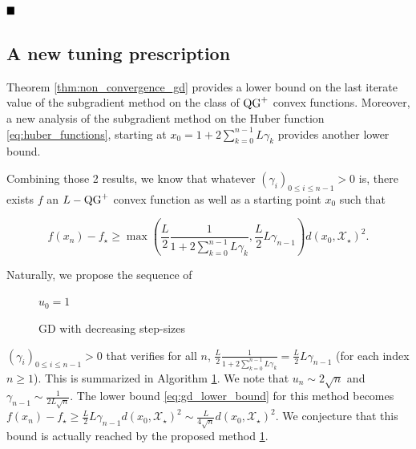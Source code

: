 $\hfill\blacksquare$

\subsection{A new tuning prescription}\label{apx:gd_conjecture}

Theorem \ref{thm:non_convergence_gd} provides a lower bound on the last iterate value of the subgradient method on the class of $\operatorname{QG}^+$ convex functions. Moreover, a new analysis of the subgradient method on the Huber function \eqref{eq:huber_functions}, starting at $x_0 = 1 + 2 \sum_{k=0}^{n-1} L\gamma_k$ provides another lower bound.

Combining those 2 results, we know that whatever $(\gamma_i)_{0 \leq i \leq n-1}>0$ is, there exists $f$ an $L-\operatorname{QG}^+$ convex function as well as a starting point $x_0$ such that

\begin{equation}
    \label{eq:gd_lower_bound}
    f(x_n) - f_\star \geq \max\left(\frac{L}{2}\frac{1}{1 + 2 \sum_{k=0}^{n-1} L\gamma_k}, \frac{L}{2}L\gamma_{n-1}\right) d(x_0, \mathcal{X}_\star)^2.
\end{equation}

Naturally, we propose the sequence of

\begin{figure}
\vspace{-1cm}
\begin{minipage}{0.45\textwidth}
\begin{algorithm}[H]
    \caption{GD with decreasing step-sizes}\label{alg:gd_decreasing_step_sizes}
    $u_0 = 1$
    
\end{algorithm}
\end{minipage}
\end{figure}

\noindent $(\gamma_i)_{0 \leq i \leq n-1}>0$ that verifies for all $n$, $\frac{L}{2}\frac{1}{1 + 2 \sum_{k=0}^{n-1} L\gamma_k} = \frac{L}{2}L\gamma_{n-1}$ (for each index $n \geq 1$). This is summarized in Algorithm \ref{alg:gd_decreasing_step_sizes}.
We note that $u_n \sim 2\sqrt{n}$ and $\gamma_{n-1} \sim \frac{1}{2L\sqrt{n}}$.
The lower bound \eqref{eq:gd_lower_bound} for this method becomes $f(x_n) - f_\star \geq \frac{L}{2}L\gamma_{n-1} d(x_0, \mathcal{X}_\star)^2 \sim \frac{L}{4\sqrt{n}} d(x_0, \mathcal{X}_\star)^2$.
We conjecture that this bound is actually reached by the proposed method \ref{alg:gd_decreasing_step_sizes}.

